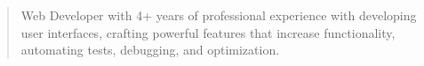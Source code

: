 \documentclass[10pt,a4paper,ragged2e,withhyper]{altacv}
\begin{document}
\begin{paracol}{2}
            
            
            
        
        
        
        
        
        \newpage
        
        \switchcolumn
        
            \begin{quote}
                Web Developer with 4+ years of professional experience with developing user interfaces, crafting powerful features that increase functionality, automating tests, debugging, and optimization.
            \end{quote}
            \medskip
        

\end{paracol}
\end{document}
